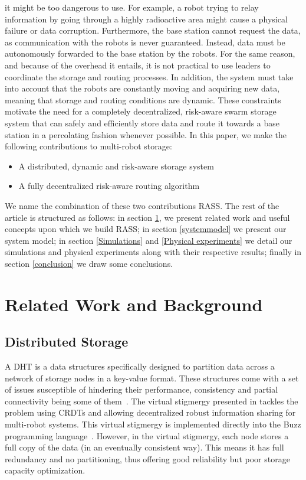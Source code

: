 it might be too dangerous to use. For example, a robot trying to relay
information by going through a highly radioactive area might cause a
physical failure or data corruption. Furthermore, the base station
cannot request the data, as communication with the robots is
never guaranteed. Instead, data must be autonomously forwarded to the base station
by the robots. For the same reason, and because of the overhead it
entails, it is not practical to use leaders to coordinate the storage
and routing processes. In addition, the system must take into account 
that the robots are constantly moving and acquiring new data,
meaning that storage and routing conditions are dynamic. These
constraints motivate the need for a completely decentralized,
risk-aware swarm storage system that can safely and efficiently store
data and route it towards a base station in a percolating fashion
whenever possible. In this paper, we make the following contributions
to multi-robot storage:

\begin{itemize}
    \item A distributed, dynamic and risk-aware storage system
    \item A fully decentralized risk-aware routing algorithm
\end{itemize}

We name the combination of these two contributions \ac{RASS}.
The rest of the article is structured as follows: in section \ref{relatedwork}, we
present related work and useful concepts upon which we build \ac{RASS}; in section \ref{systemmodel} we present our system model; in section \ref{Simulations} and \ref{Physical experiments} we
detail our simulations and physical experiments along with their respective results; finally in section \ref{conclusion} we
draw some conclusions.

\section{Related Work and Background}
\label{relatedwork}

\subsection{Distributed Storage}

A \ac{DHT} is a data structures specifically
designed to partition data across a network of storage nodes in a
key-value format. These structures come with a set of issues susceptible of
hindering their performance, consistency and partial connectivity
being some of them~\cite{amigoni2017multirobot}. The virtual stigmergy
presented in \cite{pinciroliTuple2016} tackles the problem using
\ac{CRDT}s and allowing decentralized
robust information sharing for multi-robot systems. This virtual
stigmergy is implemented directly into the Buzz programming
language~\cite{pinciroliBuzz2016}. However, in the virtual stigmergy,
each node stores a full copy of the data (in an eventually consistent
way). This means it has full redundancy and no partitioning, thus
offering good reliability but poor storage capacity optimization.


